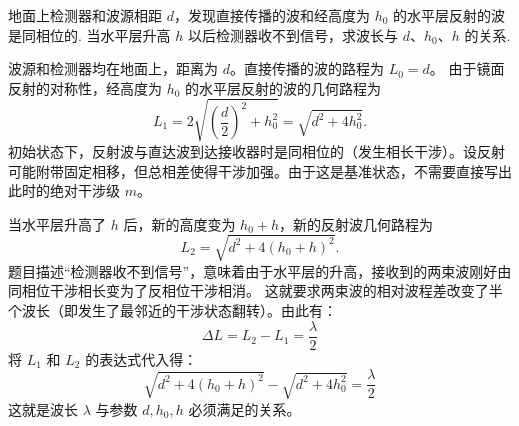 \begin{exercise}\label{ex:8.16}
地面上检测器和波源相距 $d$，发现直接传播的波和经高度为 $h_0$ 的水平层反射的波是同相位的. 当水平层升高 $h$ 以后检测器收不到信号，求波长与 $d$、$h_0$、$h$ 的关系.
\end{exercise}
\begin{solution}
波源和检测器均在地面上，距离为 $d$。直接传播的波的路程为 $L_0 = d$。
由于镜面反射的对称性，经高度为 $h_0$ 的水平层反射的波的几何路程为
\[
L_1=2\sqrt{\left(\frac d2\right)^2+h_0^2}
   =\sqrt{d^2+4h_0^2}.
\]
初始状态下，反射波与直达波到达接收器时是同相位的（发生相长干涉）。设反射可能附带固定相移，但总相差使得干涉加强。由于这是基准状态，不需要直接写出此时的绝对干涉级 $m$。

当水平层升高了 $h$ 后，新的高度变为 $h_0+h$，新的反射波几何路程为
\[
L_2=\sqrt{d^2+4(h_0+h)^2}.
\]
题目描述“检测器收不到信号”，意味着由于水平层的升高，接收到的两束波刚好由同相位干涉相长变为了反相位干涉相消。
这就要求两束波的相对波程差改变了半个波长（即发生了最邻近的干涉状态翻转）。由此有：
$$ \Delta L = L_2 - L_1 = \frac{\lambda}{2} $$
将 $L_1$ 和 $L_2$ 的表达式代入得：
$$ \sqrt{d^2 + 4(h_0 + h)^2} - \sqrt{d^2 + 4h_0^2} = \frac{\lambda}{2} $$
这就是波长 $\lambda$ 与参数 $d, h_0, h$ 必须满足的关系。
\end{solution}

